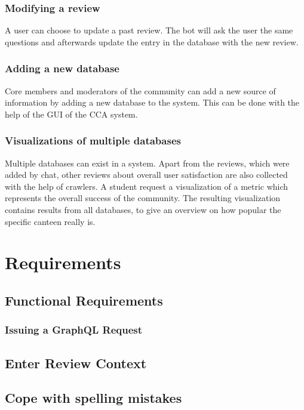 \subsubsection{Modifying a review} A user can choose to update a past review. The bot will ask the user the same questions and afterwards update the entry in the database with the new review.

\subsubsection{Adding a new database} Core members and moderators of the community can add a new source of information by adding a new database to the system. This can be done with the help of the GUI of the CCA system.

\subsubsection{Visualizations of multiple databases} Multiple databases can exist in a system. Apart from the reviews, which were added by chat, other reviews about overall user satisfaction are also collected with the help of crawlers. A student request a visualization of a metric which represents the overall success of the community. The resulting visualization contains results from all databases, to give an overview on how popular the specific canteen really is.

\section{Requirements}

\subsection{Functional Requirements}

\subsubsection{Issuing a GraphQL Request}

\subsection{Enter Review Context}

\subsection{Cope with spelling mistakes}

